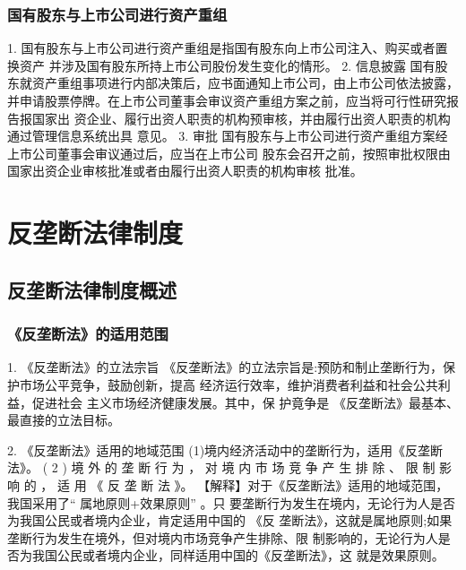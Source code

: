 \documentclass[UTF8,12pt]{ctexart}
\numberwithin{equation}{section} %
\numberwithin{figure}{section}
\numberwithin{table}{section}
\begin{document}
	\subsubsection{国有股东与上市公司进行资产重组}
	1. 国有股东与上市公司进行资产重组是指国有股东向上市公司注入、购买或者置换资产
	并涉及国有股东所持上市公司股份发生变化的情形。
	2. 信息披露
	国有股东就资产重组事项进行内部决策后，应书面通知上市公司，由上市公司依法披露，
	并申请股票停牌。在上市公司董事会审议资产重组方案之前，应当将可行性研究报告报国家出
	资企业、履行出资人职责的机构预审核，并由履行出资人职责的机构通过管理信息系统出具
	意见。
	3. 审批
	国有股东与上市公司进行资产重组方案经 上市公司董事会审议通过后，应当在上市公司
	股东会召开之前，按照审批权限由国家出资企业审核批准或者由履行出资人职责的机构审核
	批准。
	
	\newpage
	\section{反垄断法律制度}
	
	\subsection{反垄断法律制度概述}
	
	\subsubsection{ 《反垄断法》的适用范围}
	1. 《反垄断法》的立法宗旨
	《反垄断法》的立法宗旨是:预防和制止垄断行为，保护市场公平竞争，鼓励创新，提高
	经济运行效率，维护消费者利益和社会公共利益，促进社会 主义市场经济健康发展。其中，保
	护竟争是 《反垄断法》最基本、最直接的立法目标。
	
	2. 《反垄断法》适用的地域范围
	(1)境内经济活动中的垄断行为，适用《反垄断法》。
	( 2 ) 境 外 的 垄 断 行 为 ， 对 境 内 市 场 竞 争 产 生 排 除 、 限 制 影 响 的 ， 适 用 《 反 垄 断 法 》。
	【解释】对于《反垄断法》适用的地域范围，我国采用了“ 属地原则+效果原则” 。只
	要垄断行为发生在境内，无论行为人是否为我国公民或者境内企业，肯定适用中国的 《反
	垄断法》，这就是属地原则;如果垄断行为发生在境外，但对境内市场竞争产生排除、限
	制影响的，无论行为人是否为我国公民或者境内企业，同样适用中国的《反垄断法》，这
	就是效果原则。
	
\end{document}
